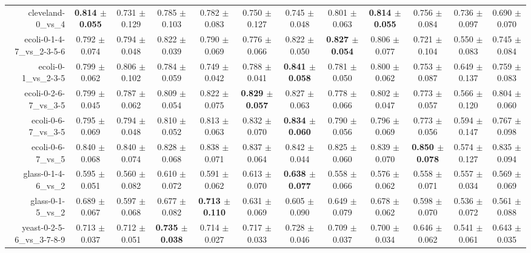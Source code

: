 \begin{table}[!ht]
{\begin{tabular}{r c c c c c c c c c c c}
cleveland-0\_vs\_4 & \textbf{0.814 $\pm$ 0.055} & 0.731 $\pm$ 0.129 & 0.785 $\pm$ 0.103 & 0.782 $\pm$ 0.083 & 0.750 $\pm$ 0.127 & 0.745 $\pm$ 0.048 & 0.801 $\pm$ 0.063 & \textbf{0.814 $\pm$ 0.055} & 0.756 $\pm$ 0.084 & 0.736 $\pm$ 0.097 & 0.690 $\pm$ 0.070 \\
ecoli-0-1-4-7\_vs\_2-3-5-6 & 0.792 $\pm$ 0.074 & 0.794 $\pm$ 0.048 & 0.822 $\pm$ 0.039 & 0.790 $\pm$ 0.069 & 0.776 $\pm$ 0.066 & 0.822 $\pm$ 0.050 & \textbf{0.827 $\pm$ 0.054} & 0.806 $\pm$ 0.077 & 0.721 $\pm$ 0.104 & 0.550 $\pm$ 0.083 & 0.745 $\pm$ 0.084 \\
ecoli-0-1\_vs\_2-3-5 & 0.799 $\pm$ 0.062 & 0.806 $\pm$ 0.102 & 0.784 $\pm$ 0.059 & 0.749 $\pm$ 0.042 & 0.788 $\pm$ 0.041 & \textbf{0.841 $\pm$ 0.058} & 0.781 $\pm$ 0.050 & 0.800 $\pm$ 0.062 & 0.753 $\pm$ 0.087 & 0.649 $\pm$ 0.137 & 0.759 $\pm$ 0.083 \\
ecoli-0-2-6-7\_vs\_3-5 & 0.799 $\pm$ 0.045 & 0.787 $\pm$ 0.062 & 0.809 $\pm$ 0.054 & 0.822 $\pm$ 0.075 & \textbf{0.829 $\pm$ 0.057} & 0.827 $\pm$ 0.063 & 0.778 $\pm$ 0.066 & 0.802 $\pm$ 0.047 & 0.773 $\pm$ 0.057 & 0.566 $\pm$ 0.120 & 0.804 $\pm$ 0.060 \\
ecoli-0-6-7\_vs\_3-5 & 0.795 $\pm$ 0.069 & 0.794 $\pm$ 0.048 & 0.810 $\pm$ 0.052 & 0.813 $\pm$ 0.063 & 0.832 $\pm$ 0.070 & \textbf{0.834 $\pm$ 0.060} & 0.790 $\pm$ 0.056 & 0.796 $\pm$ 0.069 & 0.773 $\pm$ 0.056 & 0.594 $\pm$ 0.147 & 0.767 $\pm$ 0.098 \\
ecoli-0-6-7\_vs\_5 & 0.840 $\pm$ 0.068 & 0.840 $\pm$ 0.074 & 0.828 $\pm$ 0.068 & 0.838 $\pm$ 0.071 & 0.837 $\pm$ 0.064 & 0.842 $\pm$ 0.044 & 0.825 $\pm$ 0.060 & 0.839 $\pm$ 0.070 & \textbf{0.850 $\pm$ 0.078} & 0.574 $\pm$ 0.127 & 0.835 $\pm$ 0.094 \\
glass-0-1-4-6\_vs\_2 & 0.595 $\pm$ 0.051 & 0.560 $\pm$ 0.082 & 0.610 $\pm$ 0.072 & 0.591 $\pm$ 0.062 & 0.613 $\pm$ 0.070 & \textbf{0.638 $\pm$ 0.077} & 0.558 $\pm$ 0.066 & 0.576 $\pm$ 0.062 & 0.558 $\pm$ 0.071 & 0.557 $\pm$ 0.034 & 0.569 $\pm$ 0.069 \\
glass-0-1-5\_vs\_2 & 0.689 $\pm$ 0.067 & 0.597 $\pm$ 0.068 & 0.677 $\pm$ 0.082 & \textbf{0.713 $\pm$ 0.110} & 0.631 $\pm$ 0.069 & 0.605 $\pm$ 0.090 & 0.649 $\pm$ 0.079 & 0.678 $\pm$ 0.062 & 0.598 $\pm$ 0.070 & 0.536 $\pm$ 0.072 & 0.561 $\pm$ 0.088 \\
yeast-0-2-5-6\_vs\_3-7-8-9 & 0.713 $\pm$ 0.037 & 0.712 $\pm$ 0.051 & \textbf{0.735 $\pm$ 0.038} & 0.714 $\pm$ 0.027 & 0.717 $\pm$ 0.033 & 0.728 $\pm$ 0.046 & 0.709 $\pm$ 0.037 & 0.700 $\pm$ 0.034 & 0.646 $\pm$ 0.062 & 0.541 $\pm$ 0.061 & 0.643 $\pm$ 0.035 \\

\end{tabular}}
\end{table}
